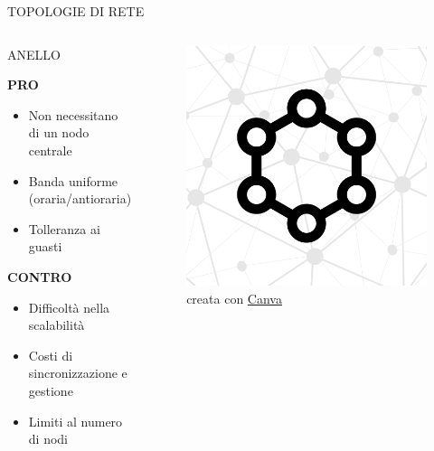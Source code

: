 \documentclass[aspectratio=1610,handout]{beamer}
\begin{document}
\begin{frame}{TOPOLOGIE DI RETE}
    \begin{columns}
            \justifying
            \begin{alertblock}{ANELLO}
                \begin{minipage}{0.96\linewidth}
                    \justifying
                    \textbf{PRO}
                    \begin{itemize}
                        \item Non necessitano di un nodo centrale
                        \pause
                        \item Banda uniforme (oraria/antioraria)
                        \pause
                        \item Tolleranza ai guasti
                    \end{itemize}
                    \pause
                    \textbf{CONTRO}
                    \begin{itemize}
                        \item Difficoltà nella scalabilità
                        \pause
                        \item Costi di sincronizzazione e gestione
                        \pause
                        \item Limiti al numero di nodi
                    \end{itemize}
                \end{minipage}
            \end{alertblock}
            \begin{figure}
                \includegraphics[width=\linewidth]{img/anello.png}
                \caption{{creata con \href{https://www.canva.com/}{Canva}}}
            \end{figure}
    \end{columns}
\end{frame}
\end{document}
